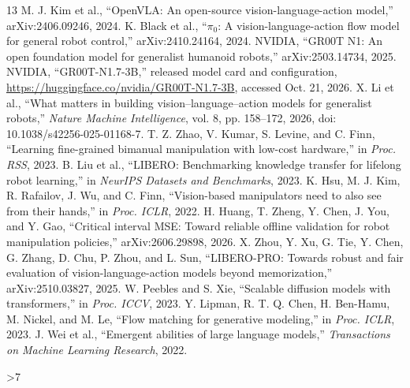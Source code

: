 \documentclass[conference]{IEEEtran}
\begin{document}
\begin{thebibliography}{13}
 M. J. Kim et al., ``OpenVLA: An open-source vision-language-action
model,'' arXiv:2406.09246, 2024.
 K. Black et al., ``$\pi_0$: A vision-language-action flow model for
general robot control,'' arXiv:2410.24164, 2024.
 NVIDIA, ``GR00T N1: An open foundation model for generalist
humanoid robots,'' arXiv:2503.14734, 2025.
 NVIDIA, ``GR00T-N1.7-3B,'' released model card and configuration,
\url{https://huggingface.co/nvidia/GR00T-N1.7-3B}, accessed Oct. 21, 2026.
 X. Li et al., ``What matters in building vision--language--action
models for generalist robots,'' \emph{Nature Machine Intelligence}, vol. 8,
pp. 158--172, 2026, doi: 10.1038/s42256-025-01168-7.
 T. Z. Zhao, V. Kumar, S. Levine, and C. Finn, ``Learning fine-grained
bimanual manipulation with low-cost hardware,'' in \emph{Proc. RSS}, 2023.
 B. Liu et al., ``LIBERO: Benchmarking knowledge transfer for
lifelong robot learning,'' in \emph{NeurIPS Datasets and Benchmarks}, 2023.
 K. Hsu, M. J. Kim, R. Rafailov, J. Wu, and C. Finn,
``Vision-based manipulators need to also see from their hands,''
in \emph{Proc. ICLR}, 2022.
 H. Huang, T. Zheng, Y. Chen, J. You, and Y. Gao, ``Critical interval
MSE: Toward reliable offline validation for robot manipulation policies,''
arXiv:2606.29898, 2026.
 X. Zhou, Y. Xu, G. Tie, Y. Chen, G. Zhang, D. Chu, P. Zhou,
and L. Sun, ``LIBERO-PRO: Towards robust and fair evaluation of vision-language-action
models beyond memorization,'' arXiv:2510.03827, 2025.
 W. Peebles and S. Xie, ``Scalable diffusion models with transformers,''
in \emph{Proc. ICCV}, 2023.
 Y. Lipman, R. T. Q. Chen, H. Ben-Hamu, M. Nickel, and M. Le,
``Flow matching for generative modeling,'' in \emph{Proc. ICLR}, 2023.
 J. Wei et al., ``Emergent abilities of large language models,''
\emph{Transactions on Machine Learning Research}, 2022.
\end{thebibliography}
\clearpage
\ifnum\value{page}>7
  \PackageError{camera-ready}{Manuscript exceeds six pages}{Reduce content without changing the conference layout.}
\fi
\end{document}
